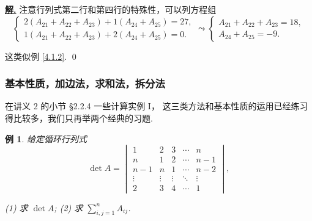 \documentclass[10pt,openany]{article}
\theoremstyle{thmstyle} %
\theoremstyle{defstyle} %
\theoremstyle{prostyle} %
\theoremstyle{exastyle}
\newtheorem{example}[theorem]{例}
\theoremstyle{remstyle}
\newenvironment{solution}{\par\underline{\textbf{解.}} \;\fangsong}{\qed\par}
\begin{document}
\begin{solution}
	注意行列式第二行和第四行的特殊性，可以列方程组
	\[ \left\{ \begin{array}{l}
		2(A_{21}+A_{22}+A_{23})+1(A_{24}+A_{25})=27, \\
		1(A_{21}+A_{22}+A_{23})+2(A_{24}+A_{25})=0.
	\end{array}\right. \leadsto \left\{ \begin{array}{l}
	A_{21}+A_{22}+A_{23}=18, \\
	A_{24}+A_{25}=-9.
	\end{array}\right. \]
	
	这类似例 \ref{4.1.2}.
\end{solution}


\subsubsection{基本性质，加边法，求和法，拆分法}

在讲义 2 的小节 \S 2.2.4 一些计算实例 I， 这三类方法和基本性质的运用已经练习得比较多，我们只再举两个经典的习题.

\begin{example} \label{4.1.4}
	给定循环行列式
	\[ \det A = \begin{vmatrix}
		1 & 2 & 3 & \cdots & n \\
		n & 1 & 2 & \cdots & n-1 \\
		n-1 & n & 1 & \cdots & n-2 \\
		\vdots & \vdots & \vdots & \ddots & \vdots \\
		2 & 3 & 4 & \cdots & 1
	\end{vmatrix}, \]
	
	(1) 求 \( \det A \); (2) 求 \( \sum_{i,j=1}^{n} A_{ij} \).
\end{example}
\end{document}
